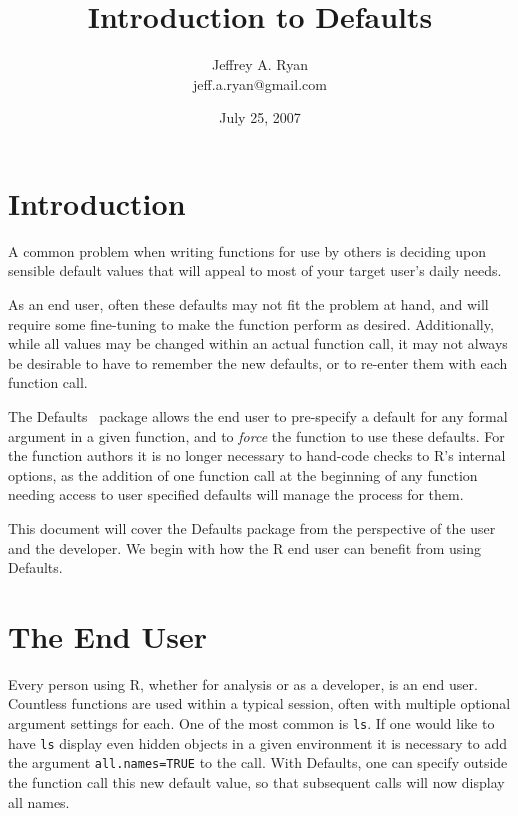 \documentclass{article}
\title{\bf Introduction to Defaults }
\author{Jeffrey A. Ryan \\
       jeff.a.ryan@gmail.com}
\date{July 25, 2007}
\begin{document}
\maketitle

\section{Introduction}
A common problem when writing functions
for use by others is deciding upon sensible
default values that will appeal to most of
your target user's daily  needs.

\vspace{5mm}
\noindent
As an end user, often these defaults may not fit
the problem at hand, and will require some fine-tuning
to make the function perform as desired.  Additionally,
while all 
values may be changed within an actual
function call, it may not always be desirable to
have to remember the new defaults, or to re-enter
them with each function call.

\vspace{5mm}
\noindent
The {\sf Defaults}~\cite{p} package allows the end user
to pre-specify a default for any formal argument
in a given function, and to {\em force} the function
to use these defaults. For the function authors it
is no longer necessary to hand-code checks to
{\sf R}'s internal {\sf options}, as the addition
of one function call at the beginning of any function
needing access to user specified defaults will 
manage the process for them. 

\vspace{5mm}
\noindent
This document will cover the {\sf Defaults} package
from the perspective of the user and the developer. We begin
with how the {\sf R} end user can benefit from using
{\sf Defaults}.


\section{The End User}
Every person using R, whether for analysis or as a
developer, is an end user. Countless functions
are used within a typical session, often with
multiple optional argument settings for each.
One of the most common is {\tt ls}. If one would like
to have {\tt ls} display even hidden objects in a given environment
it is necessary to add the argument {\tt all.names=TRUE} to the call.
With {\sf Defaults}, one can specify outside the function call this
new default value, so that subsequent calls will now display all
names.
\end{document}
